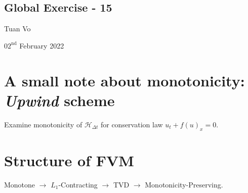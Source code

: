 \documentclass[12pt]{article}
\begin{document}
\begin{center}
	\section*{Global Exercise - 15}
\end{center}
\begin{center}
	Tuan Vo
\end{center}
\begin{center}
	$02^{\text{nd}}$ February 2022
\end{center}


\section{A small note about monotonicity: \emph{Upwind} scheme}
\begin{example}
	Examine monotonicity of $\mathcal{H}_{\Delta t}$ for conservation law $u_{t} + f(u)_x = 0$.
\end{example}


\clearpage
\section{Structure of FVM}
\begin{example}
	Monotone $\rightarrow$ $L_1$-Contracting $\rightarrow$ TVD $\rightarrow$ Monotonicity-Preserving.
\end{example}

\clearpage
\end{document}
